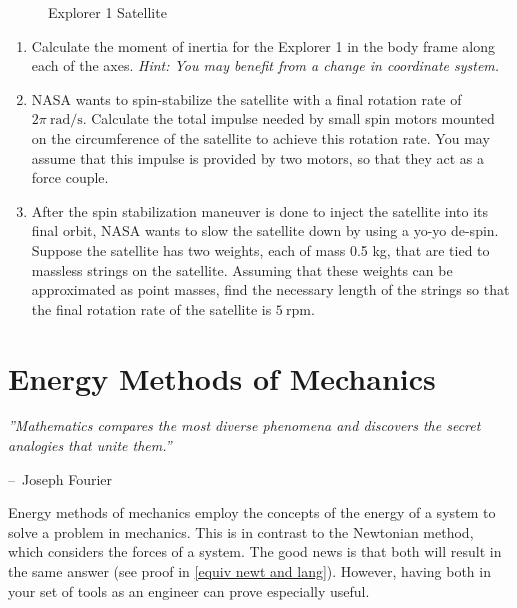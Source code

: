 \documentclass[12pt]{report}
\makeatletter
\newenvironment{chapquote}[2][2em]
  {\setlength{\@tempdima}{#1}%
   \def\chapquote@author{#2}%
   \parshape 1 \@tempdima \dimexpr\textwidth-2\@tempdima\relax%
   \itshape}
  {\par\normalfont\hfill--\ \chapquote@author\hspace*{\@tempdima}\par\bigskip}
\makeatother
\begin{document}
\begin{enumerate}
\begin{figure}[ht]

    \caption{Explorer 1 Satellite}
    \label{fig:explorer 1}
\end{figure}
\begin{enumerate}
    \item Calculate the moment of inertia for the Explorer 1 in the body frame along each of the axes. \textit{Hint: You may benefit from a change in coordinate system.}
    \item NASA wants to spin-stabilize the satellite with a final rotation rate of $2\pi \ \mathrm{rad/s}$. Calculate the total impulse needed by small spin motors mounted on the circumference of the satellite to achieve this rotation rate. You may assume that this impulse is provided by two motors, so that they act as a force couple.
    \item After the spin stabilization maneuver is done to inject the satellite into its final orbit, NASA wants to slow the satellite down by using a yo-yo de-spin. Suppose the satellite has two weights, each of mass 0.5 kg, that are tied to massless strings on the satellite. Assuming that these weights can be approximated as point masses, find the necessary length of the strings so that the final rotation rate of the satellite is $5 \ \mathrm{rpm}$.
\end{enumerate}
\end{enumerate}
\chapter{Energy Methods of Mechanics}\label{sec:energy methods}
\begin{chapquote}{Joseph Fourier}
    ''Mathematics compares the most diverse phenomena and discovers the secret analogies that unite them.''
\end{chapquote}

Energy methods of mechanics employ the concepts of the energy of a system to solve a problem in mechanics. This is in contrast to the Newtonian method, which considers the forces of a system. The good news is that both will result in the same answer (see proof in \ref{equiv newt and lang}). However, having both in your set of tools as an engineer can prove especially useful.
\end{document}
